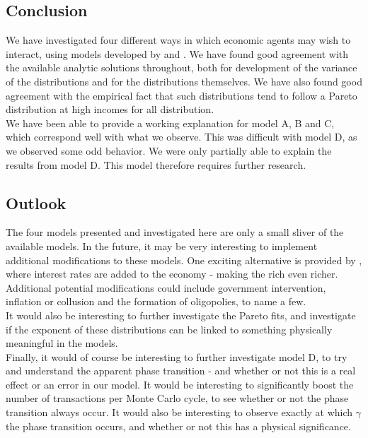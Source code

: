 \documentclass[a4paper, 10pt]{article}
\begin{document}
\subsection{Conclusion}
We have investigated four different ways in which economic agents may wish to interact, using models developed by \cite{Gibbs} and \cite{AgentBased}. We have found good agreement with the available analytic solutions throughout, both for development of the variance of the distributions and for the distributions themselves. We have also found good agreement with the empirical fact that such distributions tend to follow a Pareto distribution at high incomes for all distribution.\\
\linebreak
We have been able to provide a working explanation for model A, B and C, which correspond well with what we observe. This was difficult with model D, as we observed some odd behavior. We were only partially able to explain the results from model D. This model therefore requires further research.
\subsection{Outlook}
The four models presented and investigated here are only a small sliver of the available models. In the future, it may be very interesting to implement additional modifications to these models. One exciting alternative is provided by \cite{DoublePower}, where interest rates are added to the economy - making the rich even richer. Additional potential modifications could include government intervention, inflation or collusion and the formation of oligopolies, to name a few.\\
\linebreak
It would also be interesting to further investigate the Pareto fits, and investigate if the exponent of these distributions can be linked to something physically meaningful in the models.\\
\linebreak
Finally, it would of course be interesting to further investigate model D, to try and understand the apparent phase transition - and whether or not this is a real effect or an error in our model. It would be interesting to significantly boost the number of transactions per Monte Carlo cycle, to see whether or not the phase transition always occur. It would also be interesting to observe exactly at which $\gamma$ the phase transition occurs, and whether or not this has a physical significance.
\newpage

\newpage
{}


\end{document}
